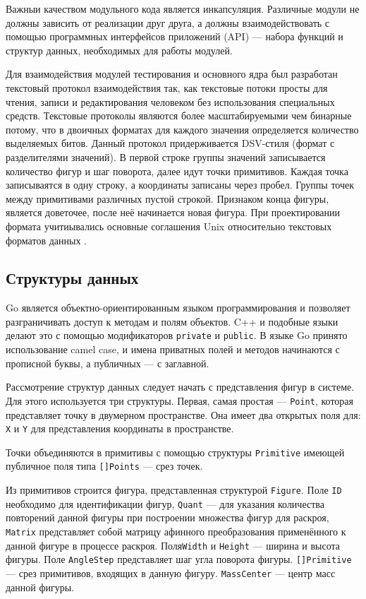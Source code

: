 \documentclass[14pt]{extarticle}
\begin{document}
	Важныи качеством модульного кода является инкапсуляция. Различные модули не должны зависить от реализации друг друга, а должны взаимодействовать с помощью программных интерфейсов приложений (API) --- набора функций и структур данных, необходимых для работы модулей.
	
	Для взаимодействия модулей тестирования и основного ядра был разработан текстовый протокол взаимодействия так, как текстовые потоки просты для чтения, записи и редактирования человеком без использования специальных средств. Текстовые протоколы являются более масштабируемыми чем бинарные потому, что в двоичных форматах для каждого значения определяется количество выделяемых битов. Данный протокол придерживается DSV-стиля (формат с разделителями значений). В первой строке группы значений записывается количество фигур и шаг поворота, далее идут точки примитивов. Каждая точка записываятся в одну строку, а координаты записаны через пробел. Группы точек между примитивами различных пустой строкой. Признаком конца фигуры, является доветочее, после неё начинается новая фигура. При проектировании формата учитиывались основные соглашения Unix относительно текстовых форматов данных \cite{Unix}.
	
	\subsection{Структуры данных}
	Go является объектно-ориентированным языком программирования и позволяет разграничивать доступ к методам и полям объектов. C++ и подобные языки делают это с помощью модификаторов \lstinline!private! и \lstinline!public!. В языке Go принято использование camel case, и имена приватных полей и методов начинаются с прописной буквы, а публичных --- с заглавной.
	
	
	Рассмотрение структур данных следует начать с представления фигур в системе.
	Для этого используется три структуры. Первая, самая простая --- \lstinline!Point!, которая представляет точку в двумерном пространстве.	Она имеет два открытых поля для: \lstinline!X! и \lstinline!Y! для представления координаты в пространстве.
	
	
	Точки объединяются в примитивы с помощью структуры \lstinline|Primitive| имеющей публичное поля типа \lstinline|[]Points| --- срез точек.
	
	
	Из примитивов строится фигура, представленная структурой \lstinline|Figure|. Поле \lstinline|ID| необходимо для идентификации фигур, \lstinline|Quant| --- для указания количества повторений данной фигуры при построении множества фигур для раскроя, \lstinline|Matrix| представляет собой матрицу афинного преобразования применённого к данной фигуре в процессе раскроя. Поля\lstinline|Width| и \lstinline|Height| --- ширина и высота фигуры. Поле \lstinline|AngleStep| представляет шаг угла поворота фигуры. \lstinline|[]Primitive| --- срез примитивов, входящих в данную фигуру. \lstinline|MassCenter| --- центр масс данной фигуры.
	
	
\end{document}
